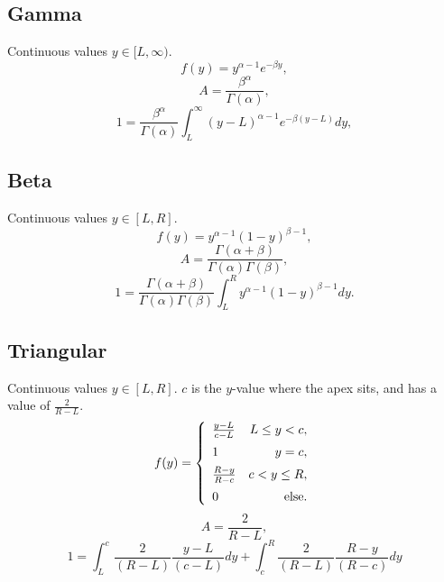 \documentclass[11pt]{article}
\begin{document}
\subsection{Gamma}
Continuous values $y\in[L,\infty)$.
\begin{equation}
f(y) = y^{\alpha-1}e^{-\beta y},
\end{equation}
\begin{equation}
A = \frac{\beta^\alpha}{\Gamma(\alpha)},
\end{equation}
\begin{equation}
1 = \frac{\beta^\alpha}{\Gamma(\alpha)}\int_L^\infty (y-L)^{\alpha-1}e^{-\beta (y-L)} dy,
\end{equation}

\subsection{Beta}
Continuous values $y\in[L,R]$.
\begin{equation}
f(y) = y^{\alpha-1}(1-y)^{\beta-1},
\end{equation}
\begin{equation}
A =\frac{ \Gamma(\alpha+\beta)}{\Gamma(\alpha)\Gamma(\beta)},
\end{equation}
\begin{equation}
1 = \frac{ \Gamma(\alpha+\beta)}{\Gamma(\alpha)\Gamma(\beta)}\int_L^R y^{\alpha-1}(1-y)^{\beta-1} dy.
\end{equation}

\subsection{Triangular}
Continuous values $y\in[L,R]$.
$c$ is the $y$-value where the apex sits, and has a value of $\frac{2}{R-L}$.
\begin{equation}
f(y) = \left\{
 \begin{array}{lr}
  \frac{y-L}{c-L} & L\leq y < c,\vspace{5pt} \\ 
  1 & y=c, \vspace{5pt} \\
  \frac{R-y}{R-c} & c<y\leq R, \vspace{5pt} \\
  0 & \text{else}.
 \end{array}
\right.
\end{equation}
\begin{equation}
A = \frac{2}{R-L},
\end{equation}
\begin{equation}
1 = \int_L^c \frac{2}{(R-L)}\frac{y-L}{(c-L)} dy + \int_c^R \frac{2}{(R-L)}\frac{R-y}{(R-c)} dy
\end{equation}
\end{document}
